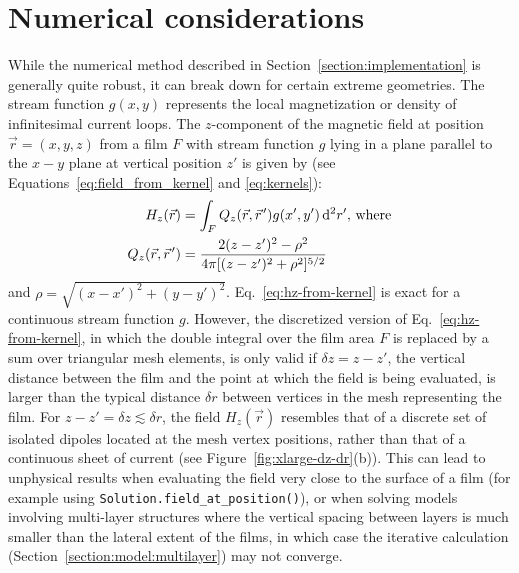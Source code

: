 \documentclass[final,3p,times,twocolumn]{elsarticle}
\newcommand{\pvec}[1]{\vec{#1}\mkern2mu\vphantom{#1}}
\newcommand{\inline}[1]{\texttt{#1}\xspace}
\begin{document}
\section{Numerical considerations}
\label{appendix:numerics}
While the numerical method described in Section~\ref{section:implementation} is generally quite robust, it can break down for certain extreme geometries. The stream function $g(x, y)$ represents the local magnetization or density of infinitesimal current loops. The $z$-component of the magnetic field at position $\vec{r}=(x, y, z)$ from a film $F$ with stream function $g$ lying in a plane parallel to the $x-y$ plane at vertical position $z'$ is given by (see Equations~\ref{eq:field_from_kernel} and \ref{eq:kernels}):
\begin{align}
\label{eq:hz-from-kernel}
\begin{split}
    H_z(\vec{r}) &= \int_F Q_z(\vec{r},\pvec{r}')g(x', y')\,\mathrm{d}^2r',\,\text{where}\\
    Q_z(\vec{r}, \pvec{r}') &=  \frac{2(z-z')^2-\rho^2}
            {4\pi[(z-z')^2+\rho^2]^{5/2}}
\end{split}
\end{align}
and $\rho=\sqrt{(x-x')^2+(y-y')^2}$. Eq.~\ref{eq:hz-from-kernel} is exact for a continuous stream function $g$. However, the discretized version of Eq.~\ref{eq:hz-from-kernel}, in which the double integral over the film area $F$ is replaced by a sum over triangular mesh elements, is only valid if $\delta z = z-z'$, the vertical distance between the film and the point at which the field is being evaluated, is larger than the typical distance $\delta r$ between vertices in the mesh representing the film. For $z-z'=\delta z\lesssim\delta r$, the field $H_z(\vec{r})$ resembles that of a discrete set of isolated dipoles located at the mesh vertex positions, rather than that of a continuous sheet of current (see Figure~\ref{fig:xlarge-dz-dr}(b)). This can lead to unphysical results when evaluating the field very close to the surface of a film (for example using \inline{Solution.field_at_position()}), or when solving models involving multi-layer structures where the vertical spacing between layers is much smaller than the lateral extent of the films, in which case the iterative calculation (Section~\ref{section:model:multilayer}) may not converge.
\end{document}
